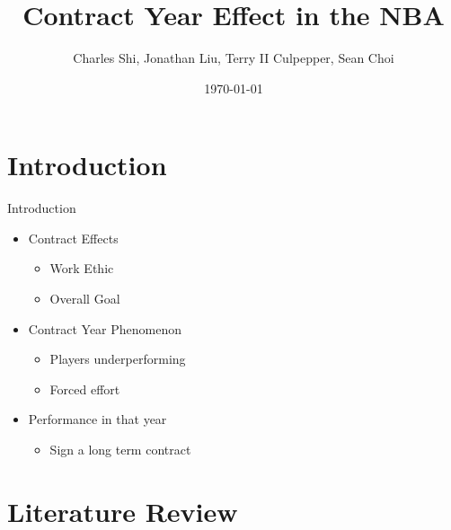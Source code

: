 \documentclass[12pt,aspectratio=916]{beamer} %
\title[Contract Year Effect]{Contract Year Effect in the NBA}
\author{Charles Shi, Jonathan Liu, Terry II Culpepper, Sean Choi}
\institute[]{University of Chicago}
\date{\today}
\begin{document}
	
	\maketitle
	
	
	
	\section{Introduction}
	
	\begin{frame}{Introduction}
	\begin{itemize}
		\item Contract Effects
		\begin{itemize}
			\item Work Ethic
			\item Overall Goal
		\end{itemize}
		\item Contract Year Phenomenon
		\begin{itemize}
			\item Players underperforming
			\item Forced effort
		\end{itemize}
		\item Performance in that year
		\begin{itemize}
			\item Sign a long term contract
		\end{itemize}
	\end{itemize}
\end{frame}


\section{Literature Review}
\end{document}

